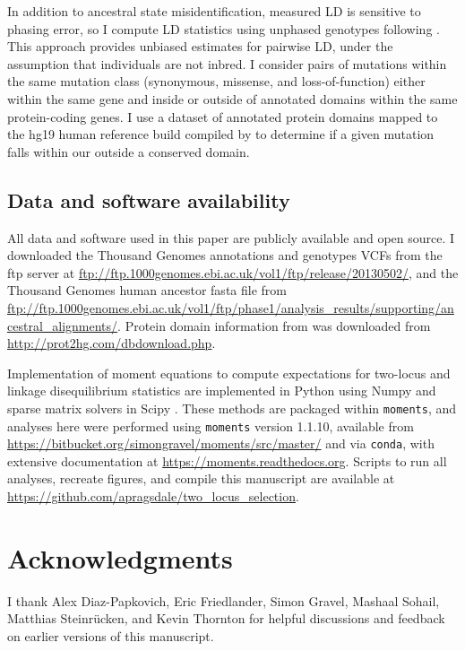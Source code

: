 \documentclass[]{article}
\begin{document}
In addition to ancestral state misidentification, measured LD is sensitive to
phasing error, so I compute LD statistics using unphased genotypes following
\citet{Ragsdale2020-nz}. This approach provides unbiased estimates for pairwise
LD, under the assumption that individuals are not inbred. I consider pairs of
mutations within the same mutation class (synonymous, missense, and
loss-of-function) either within the same gene and inside or outside of
annotated domains within the same protein-coding genes. I use a dataset of
annotated protein domains mapped to the hg19 human reference build compiled by
\citet{Stanek2020-pa} to determine if a given mutation falls within our outside
a conserved domain.

\subsection{Data and software availability}
\label{data-and-software-availability}

All data and software used in this paper are publicly available and open
source. I downloaded the Thousand Genomes annotations and genotypes VCFs from
the ftp server at
\url{ftp://ftp.1000genomes.ebi.ac.uk/vol1/ftp/release/20130502/}, and the
Thousand Genomes human ancestor fasta file from
\url{ftp://ftp.1000genomes.ebi.ac.uk/vol1/ftp/phase1/analysis_results/supporting/ancestral_alignments/}.
Protein domain information from \citet{Stanek2020-pa} was downloaded from
\url{http://prot2hg.com/dbdownload.php}.

Implementation of moment equations to compute expectations for two-locus and
linkage disequilibrium statistics are implemented in Python using Numpy
\citep{Harris2020-pc} and sparse matrix solvers in Scipy
\citep{Virtanen2020-kr}. These methods are packaged within \texttt{moments},
and analyses here were performed using \texttt{moments} version 1.1.10,
available from \url{https://bitbucket.org/simongravel/moments/src/master/} and
via \texttt{conda}, with extensive documentation at
\url{https://moments.readthedocs.org}. Scripts to run all analyses, recreate
figures, and compile this manuscript are available at
\url{https://github.com/apragsdale/two_locus_selection}.

\section{Acknowledgments}\label{acknowledgements}

I thank Alex Diaz-Papkovich, Eric Friedlander, Simon Gravel, Mashaal Sohail,
Matthias Steinrücken, and Kevin Thornton for helpful discussions and feedback
on earlier versions of this manuscript.

  

\end{document}
